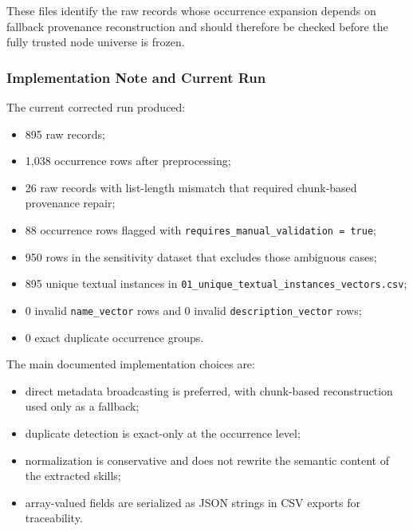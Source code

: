These files identify the raw records whose occurrence expansion depends on fallback provenance reconstruction and should therefore be checked before the fully trusted node universe is frozen.

\subsubsection{Implementation Note and Current Run}
\label{sec:step1_implementation_note}

The current corrected run produced:
\begin{itemize}
    \item 895 raw records;
    \item 1,038 occurrence rows after preprocessing;
    \item 26 raw records with list-length mismatch that required chunk-based provenance repair;
    \item 88 occurrence rows flagged with \texttt{requires\_manual\_validation = true};
    \item 950 rows in the sensitivity dataset that excludes those ambiguous cases;
    \item 895 unique textual instances in \texttt{01\_unique\_textual\_instances\_vectors.csv};
    \item 0 invalid \texttt{name\_vector} rows and 0 invalid \texttt{description\_vector} rows;
    \item 0 exact duplicate occurrence groups.
\end{itemize}

The main documented implementation choices are:
\begin{itemize}
    \item direct metadata broadcasting is preferred, with chunk-based reconstruction used only as a fallback;
    \item duplicate detection is exact-only at the occurrence level;
    \item normalization is conservative and does not rewrite the semantic content of the extracted skills;
    \item array-valued fields are serialized as JSON strings in CSV exports for traceability.
\end{itemize}
